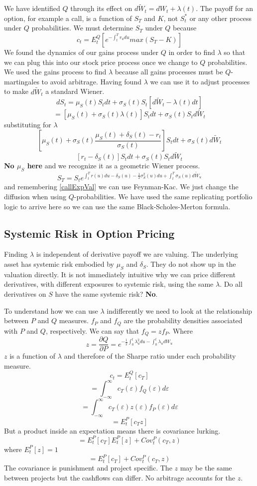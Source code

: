 \documentclass[12pt]{article}
\begin{document}
We have identified $Q$ through its effect on $d\tilde{W}_t=dW_t+\lambda(t)$.
The payoff for an option, for example a call, is a function of $S_T$ and $K$,
not $S_t^*$ or any other process under $Q$ probabilities. We must determine
$S_T$ under $Q$ because
\begin{equation} \label{callExpVal}
c_t=E_t^Q\left[ e^{-\int_t^Tr_udu}max(S_T-K) \right]
\end{equation}
We found the dynamics of our gains process under $Q$ in order to find $\lambda$
so that we can plug this into our stock price process once we change to $Q$
probabilities. We used the gains process to find $\lambda$ because all gains
processes must be $Q$-martingales to avoid arbitrage. Having found $\lambda$ we
can use it to adjust processes to make $d\tilde{W}_t$ a standard Wiener.
$$dS_t=\mu_S(t)S_tdt+\sigma_S(t)S_t[d\tilde{W}_t-\lambda(t)dt]$$
$$=[\mu_S(t)+\sigma_S(t)\lambda(t)]S_tdt+\sigma_S(t)S_td\tilde{W}_t$$
substituting for $\lambda$
$$\left[\mu_S(t)+\sigma_S(t)\frac{\mu_S(t)+\delta_S(t)-r_t}{\sigma_S(t)}\right]
S_tdt+\sigma_S(t)d\tilde{W}_t$$
$$[r_t-\delta_S(t)]S_tdt+\sigma_S(t)S_td\tilde{W}_t$$
\textbf{No $\mu_S$ here} and we recognize it as a geometric Wiener process.
$$S_T=S_te^{\int_t^Tr(u)du-\delta_S(u)-\frac{1}{2}\sigma_S^2(u)du+
\int_t^T\sigma_S(u)d\tilde{W}_u}$$
and remembering \ref{callExpVal} we can use Feynman-Kac. We just change the
diffusion when using $Q$-probabilities. We have used the same replicating
portfolio logic to arrive here so we can use the same Black-Scholes-Merton
formula.

\subsection{Systemic Risk in Option Pricing}

Finding $\lambda$ is independent of derivative payoff we are valuing. The
underlying asset has systemic risk embodied by $\mu_S$ and $\delta_S$. They do
not show up in the valuation directly. It is not immediately intuitive why we
can price different derivatives, with different exposures to systemic risk,
using the same $\lambda$. Do all derivatives on $S$ have the same systemic
risk? \textbf{No}.

To understand how we can use $\lambda$ indifferently we need to look at the
relationship between $P$ and $Q$ measures.
$f_P$ and $f_Q$ are the probability densities associated with $P$ and $Q$,
respectively. We can say that $f_Q=zf_P$. Where
$$z=\frac{\partial Q}{\partial P}=
e^{-\frac{1}{2}\int_0^t\lambda_u^2du-\int_0^t\lambda_udW_u}$$
$z$ is a function of $\lambda$ and therefore of the Sharpe ratio under each
probability measure.
$$c_t=E_t^Q[c_T]$$
$$=\int_{-\infty}^{\infty}c_T(\varepsilon)f_Q(\varepsilon)d\varepsilon$$
$$=\int_{-\infty}^{\infty}c_T(\varepsilon)z(\varepsilon)
f_P(\varepsilon)d\varepsilon$$
$$=E_t^P[c_Tz]$$
But a product inside an expectation means there is covariance lurking.
$$=E_t^P[c_T]E_t^P[z]+Cov_t^P(c_T,z)$$
where $E_t^P[z]=1$
$$=E_t^P[c_T]+Cov_t^P(c_T,z)$$
The covariance is punishment and project specific. The $z$ may be the same
between projects but the cashflows can differ. No arbitrage accounts for the
$z$.
\end{document}
